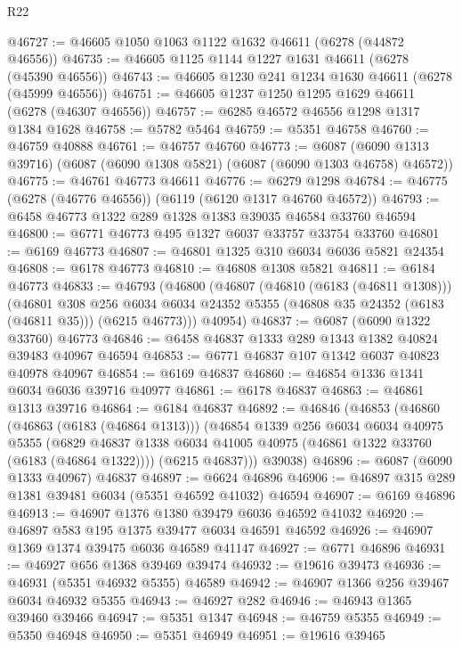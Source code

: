 \begin{lexlean}{R22}
\begin{coremodule}
@46727 := @46605 @1050 @1063 @1122 @1632 @46611 (@6278 (@44872 @46556))
@46735 := @46605 @1125 @1144 @1227 @1631 @46611 (@6278 (@45390 @46556))
@46743 := @46605 @1230 @241 @1234 @1630 @46611 (@6278 (@45999 @46556))
@46751 := @46605 @1237 @1250 @1295 @1629 @46611 (@6278 (@46307 @46556))
@46757 := @6285 @46572 @46556 @1298 @1317 @1384 @1628
@46758 := @5782 @5464
@46759 := @5351 @46758
@46760 := @46759 @40888
@46761 := @46757 @46760
@46773 := @6087 (@6090 @1313 @39716) (@6087 (@6090 @1308 @5821) (@6087 (@6090 @1303 @46758) @46572))
@46775 := @46761 @46773 @46611
@46776 := @6279 @1298
@46784 := @46775 (@6278 (@46776 @46556)) (@6119 (@6120 @1317 @46760 @46572))
@46793 := @6458 @46773 @1322 @289 @1328 @1383 @39035 @46584 @33760 @46594
@46800 := @6771 @46773 @495 @1327 @6037 @33757 @33754 @33760
@46801 := @6169 @46773
@46807 := @46801 @1325 @310 @6034 @6036 @5821 @24354
@46808 := @6178 @46773
@46810 := @46808 @1308 @5821
@46811 := @6184 @46773
@46833 := @46793
    (@46800
      (@46807
        (@46810 (@6183 (@46811 @1308)))
        (@46801
          @308
          @256
          @6034
          @6034
          @24352
          @5355
          (@46808 @35 @24352 (@6183 (@46811 @35)))
          (@6215 @46773)))
      @40954)
@46837 := @6087 (@6090 @1322 @33760) @46773
@46846 := @6458 @46837 @1333 @289 @1343 @1382 @40824 @39483 @40967 @46594
@46853 := @6771 @46837 @107 @1342 @6037 @40823 @40978 @40967
@46854 := @6169 @46837
@46860 := @46854 @1336 @1341 @6034 @6036 @39716 @40977
@46861 := @6178 @46837
@46863 := @46861 @1313 @39716
@46864 := @6184 @46837
@46892 := @46846
    (@46853
      (@46860
        (@46863 (@6183 (@46864 @1313)))
        (@46854
          @1339
          @256
          @6034
          @6034
          @40975
          @5355
          (@6829 @46837 @1338 @6034 @41005 @40975 (@46861 @1322 @33760 (@6183 (@46864 @1322))))
          (@6215 @46837)))
      @39038)
@46896 := @6087 (@6090 @1333 @40967) @46837
@46897 := @6624 @46896
@46906 := @46897 @315 @289 @1381 @39481 @6034 (@5351 @46592 @41032) @46594
@46907 := @6169 @46896
@46913 := @46907 @1376 @1380 @39479 @6036 @46592 @41032
@46920 := @46897 @583 @195 @1375 @39477 @6034 @46591 @46592
@46926 := @46907 @1369 @1374 @39475 @6036 @46589 @41147
@46927 := @6771 @46896
@46931 := @46927 @656 @1368 @39469 @39474
@46932 := @19616 @39473
@46936 := @46931 (@5351 @46932 @5355) @46589
@46942 := @46907 @1366 @256 @39467 @6034 @46932 @5355
@46943 := @46927 @282
@46946 := @46943 @1365 @39460 @39466
@46947 := @5351 @1347
@46948 := @46759 @5355
@46949 := @5350 @46948
@46950 := @5351 @46949
@46951 := @19616 @39465

\end{coremodule}
\end{lexlean}

